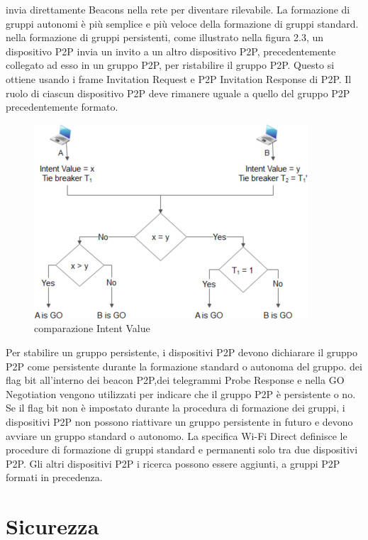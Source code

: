 invia direttamente Beacons nella rete per diventare
rilevabile. La formazione di gruppi autonomi è più
semplice e più veloce della formazione di gruppi
standard. nella formazione di gruppi persistenti, come illustrato
nella figura 2.3, un dispositivo P2P invia un invito
a un altro dispositivo P2P, precedentemente collegato
ad esso in un gruppo P2P, per ristabilire il gruppo P2P.
Questo si ottiene usando i frame Invitation Request e P2P
Invitation Response di P2P. Il ruolo di ciascun dispositivo
P2P deve rimanere uguale a quello del gruppo P2P precedentemente
formato.
\begin{figure}
\centering
\caption{comparazione Intent Value}
\includegraphics[width=0.9\columnwidth]{imgs/intentValueComparison.jpg} %
\end{figure}
Per stabilire un gruppo persistente, i dispositivi P2P
devono dichiarare il gruppo P2P come persistente durante la formazione
standard o autonoma del gruppo.
dei flag bit all'interno dei beacon P2P,dei telegrammi Probe
Response e nella GO Negotiation vengono utilizzati
per indicare che il gruppo P2P è persistente o no.
Se il flag bit non è impostato durante la procedura di formazione dei
gruppi, i dispositivi P2P non possono riattivare un gruppo persistente
in futuro e devono avviare un gruppo standard o autonomo. La specifica
Wi-Fi Direct \cite{alliance2016wi} definisce le procedure di formazione di
gruppi standard
e permanenti solo tra due dispositivi P2P. Gli altri dispositivi P2P i ricerca
possono essere aggiunti, a gruppi P2P formati in precedenza.



\section{Sicurezza}

